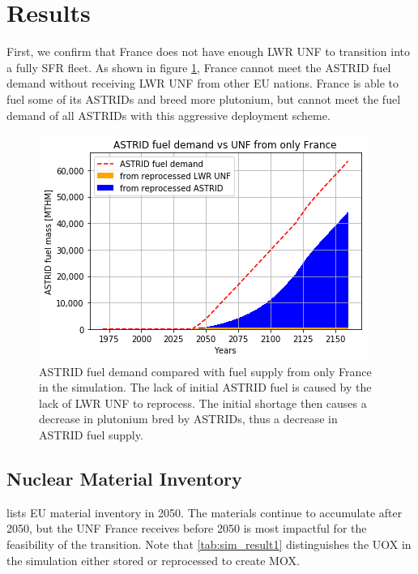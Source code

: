 \section{Results}

First, we confirm that France does not have enough
\gls{LWR} \gls{UNF} to transition into a fully \gls{SFR}
fleet. As shown in figure \ref{fig:only_france}, France
cannot meet the \gls{ASTRID} fuel demand without receiving
\gls{LWR} \gls{UNF} from other \gls{EU} nations. France
is able to fuel some of its \glspl{ASTRID} and breed more
plutonium, but cannot meet the fuel demand of 
all \glspl{ASTRID} with this aggressive deployment scheme.


\begin{figure}[htbp!]
	\begin{center}
		\includegraphics[scale=0.7]{./images/french-transition/france_only_compare.png}
	\end{center}
	\caption{\gls{ASTRID} fuel demand compared with fuel supply from only
			 France in the simulation. The lack of initial \gls{ASTRID} fuel
			 is caused by the lack of \gls{LWR} \gls{UNF} to reprocess. The
			 initial shortage then causes a decrease in plutonium bred by
			 \glspl{ASTRID}, thus a decrease in \gls{ASTRID} fuel supply.}
	\label{fig:only_france}
\end{figure}


\subsection{Nuclear Material Inventory}

lists \gls{EU} material inventory in 2050.
The materials continue to accumulate after 2050, but the
\gls{UNF} France receives before 2050 is most impactful for the
feasibility of the transition. Note that \cref{tab:sim_result1} 
distinguishes the
\gls{UOX} in the simulation either stored or reprocessed to create \gls{MOX}.


